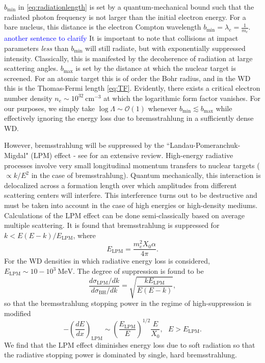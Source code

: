 \documentclass[twocolumn,showpacs,preprintnumbers,amsmath,amssymb,prd]{revtex4}
\newcommand{\OO}{\mathcal{O}}
\def\r{\right)}
\def\l{\left(}
\begin{document}
\begin{appendices}
$b_\text{min}$ in \eqref{eq:radiationlength} is set by a quantum-mechanical bound such that the radiated photon frequency is not larger than the initial electron energy. 
For a bare nucleus, this distance is the electron Compton wavelength $b_\text{min} = \lambda_e = \frac{1}{m_e}$. \textcolor{blue}{another sentence to clarify}
It is important to note that collisions at impact parameters \emph{less} than $b_\text{min}$ will still radiate, but with exponentially suppressed intensity.
Classically, this is manifested by the decoherence of radiation at large scattering angles.
$b_\text{max}$ is set by the distance at which the nuclear target is screened.
For an atomic target this is of order the Bohr radius, and in the WD this is the Thomas-Fermi length \eqref{eq:TF}.
Evidently, there exists a critical electron number density $n_e \sim 10^{32} ~\text{cm}^{-3}$ at which the logarithmic form factor vanishes.
For our purposes, we simply take $\log{\Lambda} \sim \OO(1)$ whenever $b_\text{min} \lesssim b_\text{max}$ while effectively ignoring the energy loss due to bremsstrahlung in a sufficiently dense WD.

However, bremsstrahlung will be suppressed by the ``Landau-Pomeranchuk-Migdal" (LPM) effect - see \cite{Klein:1998du} for an extensive review.
High-energy radiative processes involve very small longitudinal momentum transfers to nuclear targets ($\propto k/E^2$ in the case of bremsstrahlung).
Quantum mechanically, this interaction is delocalized across a formation length over which amplitudes from different scattering centers will interfere.
This interference turns out to be destructive and must be taken into account in the case of high energies or high-density mediums.
Calculations of the LPM effect can be done semi-classically based on average multiple scattering.
It is found that bremsstrahlung is suppressed for $k < E(E-k)/E_\text{LPM}$, where
\begin{equation}
\label{eq:LPM}
E_\text{LPM} = \frac{m_e^2 X_0 \alpha}{4 \pi}.
\end{equation}
For the WD densities in which radiative energy loss is considered, $E_\text{LPM} \sim 10-10^{3} ~\text{MeV}$.
The degree of suppression is found to be
\begin{equation}
\frac{d\sigma_\text{LPM}/dk}{d\sigma_\text{BH}/dk} = \sqrt{\frac{k E_\text{LPM}}{E (E-k)}},
\end{equation}
so that the bremsstrahlung stopping power in the regime of high-suppression is modified
\begin{equation}
\label{eq:bremloss}
-\l\frac{dE}{dx}\r_\text{LPM} \sim \l\frac{E_\text{LPM}}{E} \r^{1/2} \frac{E}{X_0}, ~~~ E>E_\text{LPM}.
\end{equation}
We find that the LPM effect diminishes energy loss due to soft radiation so that the radiative stopping power is dominated by single, hard bremsstrahlung.


\end{appendices}
\end{document}
